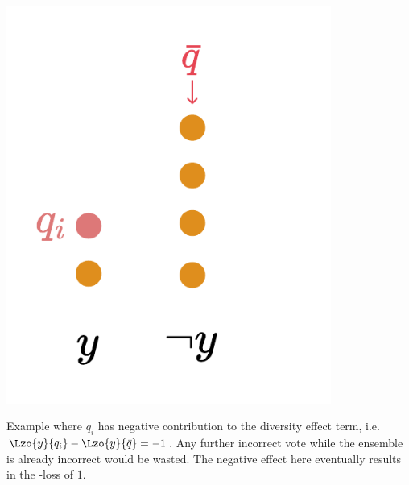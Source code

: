 \documentclass[../main.tex]{subfiles}
\begin{document}
\begin{marginfigure}
    \label{fig:zeroone-div-eff-bad}
    \includegraphics[width=0.8\textwidth]{figma-illustrations/zeroone-div-effect-bad.pdf}
    \caption{
    Example where $q_i$ has negative contribution to the diversity effect term, i.e. 
$\Lzo{y}{q_{i}} - \Lzo{y}{\bar{q}} = -1$. Any further incorrect vote while the ensemble is already incorrect would be wasted. The negative effect here eventually results in the \zeroone-loss of $1$.
}
\end{marginfigure}

\end{document}
